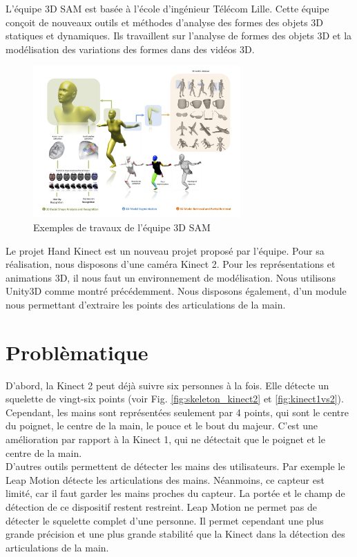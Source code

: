 L'équipe 3D SAM est basée à l'école d'ingénieur Télécom Lille. 
Cette équipe conçoit de nouveaux outils et méthodes d'analyse des 
formes des objets 3D statiques et dynamiques. Ils travaillent sur 
l'analyse de formes des objets 3D et la modélisation des variations 
des formes dans des vidéos 3D.

\begin{figure}[H]
  \begin{center}
    \includegraphics[width=300px]{images/accueil-illus.jpg}
    \caption{Exemples de travaux de l'équipe 3D SAM}
  \end{center}
\end{figure}

Le projet \og Hand Kinect \fg est un nouveau projet proposé par 
l'équipe.
Pour sa réalisation, nous disposons d'une caméra Kinect 2. 
Pour les représentations et animations 3D, il nous faut un environnement 
de modélisation. Nous utilisons Unity3D comme montré précédemment. 
Nous disposons également, d'un module nous permettant d'extraire les 
points des articulations de la main.

\section{Problèmatique}
D'abord, la Kinect 2 peut déjà suivre six personnes à la fois. Elle 
détecte un squelette de vingt-six points (voir Fig. 
\ref{fig:skeleton_kinect2} et \ref{fig:kinect1vs2}). Cependant, les 
mains sont représentées seulement par 4 points, qui sont le centre du
poignet, le centre de la main, le pouce et le bout du majeur. C'est une 
amélioration par rapport à la Kinect 1, qui ne détectait que le poignet 
et le centre de la main.\\

D'autres outils permettent de détecter les mains des utilisateurs. Par 
exemple le Leap Motion détecte les articulations des mains. Néanmoins,
ce capteur est limité, car il faut garder les mains proches du capteur.
La portée et le champ de détection de ce dispositif restent restreint. 
Leap Motion ne permet pas de détecter le squelette complet d'une personne.
Il permet cependant une plus grande précision et une plus grande stabilité
que la Kinect dans la détection des articulations de la main.\\

